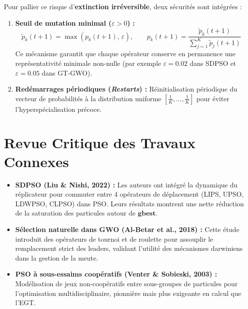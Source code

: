 Pour pallier ce risque d'\textbf{extinction irréversible}, deux sécurités sont intégrées :
\begin{enumerate}[label=\textbf{\alph*.}]
    \item \textbf{Seuil de mutation minimal ($\varepsilon > 0$) :}
    \begin{equation}
        \widetilde{p}_k(t+1) = \max\left(p_k(t+1),\, \varepsilon\right), \qquad p_k(t+1) = \frac{\widetilde{p}_k(t+1)}{\sum_{j=1}^K \widetilde{p}_j(t+1)}
        \label{eq:eps_guard}
    \end{equation}
    Ce mécanisme garantit que chaque opérateur conserve en permanence une représentativité minimale non-nulle (par exemple $\varepsilon = 0.02$ dans SDPSO et $\varepsilon = 0.05$ dans GT-GWO).
    \item \textbf{Redémarrages périodiques (\textit{Restarts}) :} Réinitialisation périodique du vecteur de probabilités à la distribution uniforme $\left[\frac{1}{K}, \dots, \frac{1}{K}\right]$ pour éviter l'hyperspécialisation précoce.
\end{enumerate}

\section{Revue Critique des Travaux Connexes}
\begin{itemize}[label=\textbullet]
    \item \textbf{SDPSO (Liu \& Nishi, 2022) \cite{liu2022strategy} :} Les auteurs ont intégré la dynamique du réplicateur pour commuter entre 4 opérateurs de déplacement (LIPS, UPSO, LDWPSO, CLPSO) dans PSO. Leurs résultats montrent une nette réduction de la saturation des particules autour de $\mathbf{gbest}$.
    \item \textbf{Sélection naturelle dans GWO (Al-Betar et al., 2018) \cite{albetar2018natural} :} Cette étude introduit des opérateurs de tournoi et de roulette pour assouplir le remplacement strict des leaders, validant l'utilité des mécanismes darwiniens dans la gestion de la meute.
    \item \textbf{PSO à sous-essaims coopératifs (Venter \& Sobieski, 2003) \cite{venter2003particle} :} Modélisation de jeux non-coopératifs entre sous-groupes de particules pour l'optimisation multidisciplinaire, pionnière mais plus exigeante en calcul que l'EGT.
\end{itemize}
